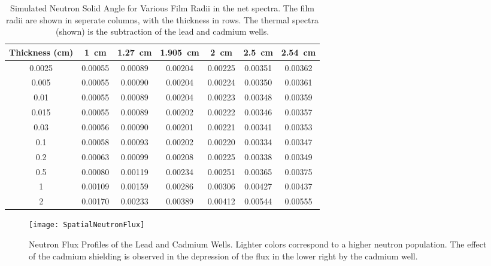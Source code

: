 \begin{table}
	\centering
	\caption[Simulated Thermal Neutron Solid Angle for Various Film Radii]{Simulated Neutron Solid Angle for Various Film Radii in the net spectra. The film radii are shown in seperate columns, with the thickness in rows. The thermal spectra (shown) is the subtraction of the lead and cadmium wells.}
	\label{tab:NeutronSolidAngle}
	\begin{tabular}{c | c c c c c c}
Thickness (\si{\cm})	&	\SI{1}{\cm}	&	\SI{1.27}{\cm}	&	\SI{1.905}{\cm}	&	\SI{2}{\cm}	&	\SI{2.5}{\cm}	&	\SI{2.54}{\cm} \\ \hline
0.0025	&	0.00055	&	0.00089	&	0.00204	&	0.00225	&	0.00351	&	0.00362	\\
0.005	&	0.00055	&	0.00090	&	0.00204	&	0.00224	&	0.00350	&	0.00361	\\
0.01	&	0.00055	&	0.00089	&	0.00204	&	0.00223	&	0.00348	&	0.00359	\\
0.015	&	0.00055	&	0.00089	&	0.00202	&	0.00222	&	0.00346	&	0.00357	\\
0.03	&	0.00056	&	0.00090	&	0.00201	&	0.00221	&	0.00341	&	0.00353	\\
0.1	&	0.00058	&	0.00093	&	0.00202	&	0.00220	&	0.00334	&	0.00347	\\
0.2	&	0.00063	&	0.00099	&	0.00208	&	0.00225	&	0.00338	&	0.00349	\\
0.5	&	0.00080	&	0.00119	&	0.00234	&	0.00251	&	0.00365	&	0.00375	\\
1	&	0.00109	&	0.00159	&	0.00286	&	0.00306	&	0.00427	&	0.00437	\\
2	&	0.00170	&	0.00233	&	0.00389	&	0.00412	&	0.00544	&	0.00555	\\
	\end{tabular}
\end{table}
\begin{figure}
	\texttt{[image: SpatialNeutronFlux]}
  \caption[Neutron Flux Profiles of the Lead and Cadmium Wells]{Neutron Flux Profiles of the Lead and Cadmium Wells. Lighter colors correspond to a higher neutron population. The effect of the cadmium shielding is observed in the depression of the flux in the lower right by the cadmium well.}
  \label{fig:NeutronFluxProfiles}
\end{figure}

